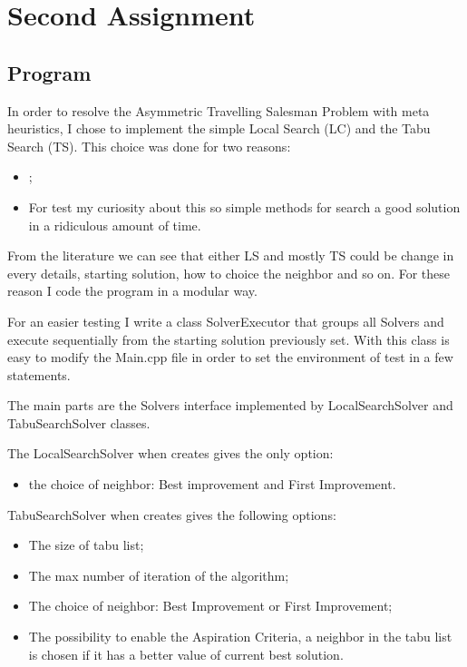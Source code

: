 \section{Second Assignment}

\subsection{Program}
	In order to resolve the Asymmetric Travelling Salesman Problem with meta heuristics, I chose to implement the simple Local Search (LC) and the Tabu Search (TS). This choice was done for two reasons: 
	\begin{itemize}
		\item ;
		\item For test my curiosity about this so simple methods for search a good solution in a ridiculous amount of time.
	\end{itemize}

	From the literature we can see that either LS and mostly TS could be change in every details, starting solution, how to choice the neighbor and so on. For these reason I code the program in a modular way.
	
	For an easier testing I write a class SolverExecutor that groups all Solvers and execute sequentially from the starting solution previously set. With this class is easy to modify the Main.cpp file in order to set the environment of test in a few statements.
	
	The main parts are the Solvers interface implemented by LocalSearchSolver and TabuSearchSolver classes. 
	
	The LocalSearchSolver when creates gives the only option:
	\begin{itemize}
		\item the choice of neighbor: Best improvement and First Improvement.
	\end{itemize}
	
	TabuSearchSolver when creates gives the following options:
	\begin{itemize}
		\item The size of tabu list;
		\item The max number of iteration of the algorithm;
		\item The choice of neighbor: Best Improvement or First Improvement;
		\item The possibility to enable the Aspiration Criteria, a neighbor in the tabu list is chosen if it has a better value of current best solution.
	\end{itemize}



	